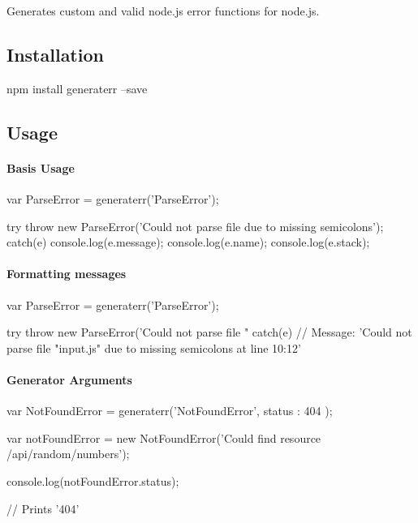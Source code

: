Generates custom and valid node.\+js error functions for node.\+js.

\subsection*{Installation}

\begin{DoxyVerb}npm install generaterr --save
\end{DoxyVerb}


\subsection*{Usage}

\paragraph*{Basis Usage}

\begin{DoxyVerb}var ParseError = generaterr('ParseError');

try
{
  throw new ParseError('Could not parse file due to missing semicolons');
} catch(e) {
  console.log(e.message);
  console.log(e.name);
  console.log(e.stack);
}
\end{DoxyVerb}


\paragraph*{Formatting messages}

\begin{DoxyVerb}var ParseError = generaterr('ParseError');

try
{
  throw new ParseError('Could not parse file "%
} catch(e) {
  // Message: 'Could not parse file "input.js" due to missing semicolons at line 10:12'
}
\end{DoxyVerb}


\paragraph*{Generator Arguments}

\begin{DoxyVerb}var NotFoundError = generaterr('NotFoundError', { status : 404 });

var notFoundError = new NotFoundError('Could find resource /api/random/numbers');

console.log(notFoundError.status);

// Prints '404'
\end{DoxyVerb}


